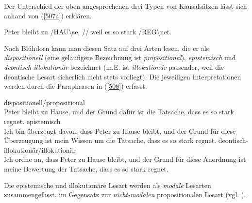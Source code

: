 Der Unterschied der oben angesprochenen drei Typen von Kausalsätzen lässt sich anhand von (\ref{507a}) erklären.

\begin{exe}
	\ex\label{507a} 
	Peter bleibt zu /HAU\textbackslash se, // weil es so stark /REG\textbackslash net. 		 
	\hfill\hbox{\citet[265]{Bluehdorn2006}}	
\end{exe}
Nach Blühdorn kann man diesen Satz auf drei Arten lesen, die er  als \textit{dispositionell} (eine geläufigere Bezeichnung ist  \textit{propositional}), \textit{epistemisch}  und \textit{deontisch-illokutionär}  bezeichnet (m.E. ist \textit{illokutionär} passender, weil die deontische Lesart sicherlich nicht stets vorliegt). Die jeweiligen Interpretationen werden durch die Paraphrasen in (\ref{508}) erfasst.	
 		                   							   
\begin{exe}
	\ex\label{508} 
		\begin{xlist}	
			\ex\label{508a} dispositionell/propositional\\
			Peter bleibt zu Hause, und der Grund dafür ist die Tatsache, dass es so stark  regnet.
			\ex\label{508b} epistemisch\\
			Ich bin überzeugt davon, dass Peter zu Hause bleibt, und der Grund für diese Überzeugung ist mein Wissen um die Tatsache, dass es so stark 					regnet.	
			\ex\label{508c} deontisch-illokutionär/illokutionär\\
			Ich ordne an, dass Peter zu Hause bleibt, und der Grund für diese Anordnung ist meine Bewertung der Tatsache, dass es so stark regnet.
			\hfill\hbox {\citet[265]{Bluehdorn2006}}			
		\end{xlist}
\end{exe}	
Die epistemische und illokutionäre Lesart werden als \textit{modale} Lesarten  zusammengefasst, im Gegensatz zur \textit{nicht-modalen} propositionalen Lesart (vgl. \citealt[265-266]{Bluehdorn2006}).

